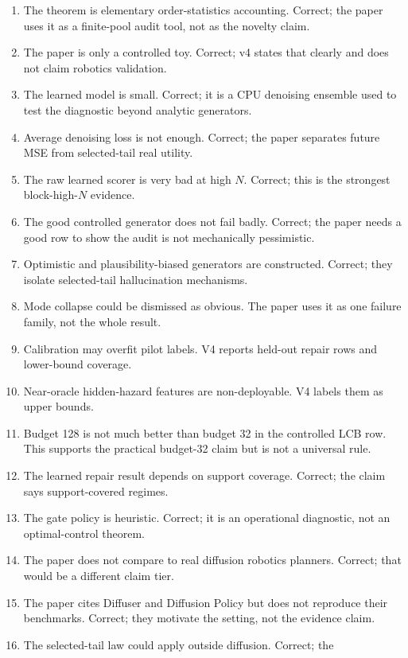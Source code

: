 \documentclass{article}
\begin{document}
\begin{enumerate}
\item The theorem is elementary order-statistics accounting. Correct; the
paper uses it as a finite-pool audit tool, not as the novelty claim.
\item The paper is only a controlled toy. Correct; v4 states that clearly and
does not claim robotics validation.
\item The learned model is small. Correct; it is a CPU denoising ensemble used
to test the diagnostic beyond analytic generators.
\item Average denoising loss is not enough. Correct; the paper separates
future MSE from selected-tail real utility.
\item The raw learned scorer is very bad at high $N$. Correct; this is the
strongest block-high-$N$ evidence.
\item The good controlled generator does not fail badly. Correct; the paper
needs a good row to show the audit is not mechanically pessimistic.
\item Optimistic and plausibility-biased generators are constructed. Correct;
they isolate selected-tail hallucination mechanisms.
\item Mode collapse could be dismissed as obvious. The paper uses it as one
failure family, not the whole result.
\item Calibration may overfit pilot labels. V4 reports held-out repair rows
and lower-bound coverage.
\item Near-oracle hidden-hazard features are non-deployable. V4 labels them as
upper bounds.
\item Budget 128 is not much better than budget 32 in the controlled LCB row.
This supports the practical budget-32 claim but is not a universal rule.
\item The learned repair result depends on support coverage. Correct; the
claim says support-covered regimes.
\item The gate policy is heuristic. Correct; it is an operational diagnostic,
not an optimal-control theorem.
\item The paper does not compare to real diffusion robotics planners. Correct;
that would be a different claim tier.
\item The paper cites Diffuser and Diffusion Policy but does not reproduce
their benchmarks. Correct; they motivate the setting, not the evidence claim.
\item The selected-tail law could apply outside diffusion. Correct; the

\end{enumerate}
\end{document}
